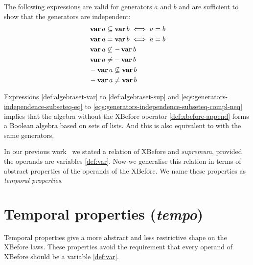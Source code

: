 \documentclass[en,twoside,onehalfspacing,phd]{risethesis}
\makeatletter
\newcommand{\todo}[1]{\@latex@warning{TODO #1}}
\def\varop{\ensuremath\operatorname{\mathbf{var}}}
\newcommand{\var}[1]{\ensuremath\varop #1}
\def\tempotext{tempo\xspace}
\def\tempoop{\ensuremath\operatorname{\mathbf{tempo}}}
\newcommand{\tempo}[2][1-4]{\ensuremath\tempoop_{#1} #2}
\makeatother
\begin{document}
The following expressions are valid for generators $a$ and $b$ and are sufficient to show that the generators are independent:
%
\begin{subequations}
\label{eqs:generators-independence}
\begin{align}
&\var a \subseteq \var b \iff a = b\label{eqs:generators-independence-subseteq-eq}\\
&\var a = \var b \iff a = b\\
&\var a \not\subseteq - \var b\\
&\var a \neq -\var b\label{eqs:generators-independence-subseteq-neq-compl} \\
&- \var a \not\subseteq \var b\\
&- \var a \neq \var b\label{eqs:generators-independence-subseteq-compl-neq}
\end{align}
\end{subequations}

Expressions \eqref{def:algebraset-var} to \eqref{def:algebraset-sup} and \eqref{eqs:generators-independence-subseteq-eq} to \eqref{eqs:generators-independence-subseteq-compl-neq} implies that the \ac{algebra} without the XBefore operator \eqref{def:xbefore-append} forms a Boolean algebra based on sets of lists.
And this is also equivalent to  with the same generators.

In our previous work~\cite{DM2015} we stated a relation of XBefore and \emph{supremum}, provided the operands are variables \eqref{def:var}.
Now we generalise this relation in terms of abstract properties of the operands of the XBefore.
We name these properties as \emph{temporal properties}.

\section{Temporal properties (\emph{\tempotext})}
\label{sec:temporal-properties}

Temporal properties give a more abstract and less restrictive shape\todo{touch?} on the XBefore laws.
These properties avoid the requirement that every operand of XBefore should be a variable \eqref{def:var}.
\end{document}
